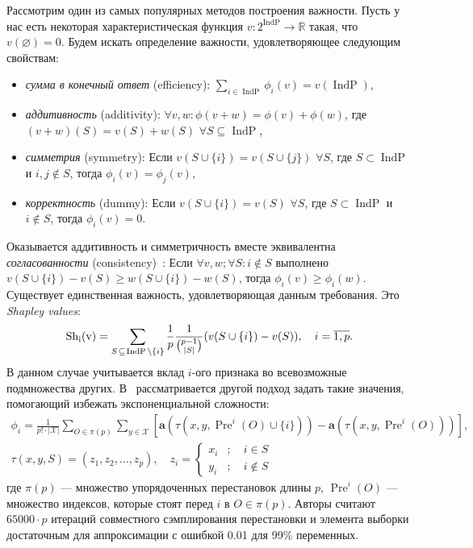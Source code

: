 \documentclass[12pt]{article}
\begin{document}
Рассмотрим один из самых популярных методов построения важности. Пусть у нас есть некоторая характеристическая функция $v: 2^{\operatorname{IndP}} \rightarrow \mathbb{R} $ такая, что $v(\varnothing)=0$. Будем искать определение важности, удовлетворяющее следующим свойствам:
\begin{itemize}[noitemsep]
    \item \emph{сумма в конечный ответ} (efficiency): $\sum_{i \in \operatorname{IndP}} \phi_{i}(v)=v(\operatorname{IndP})$,
    \item \emph{аддитивность} (additivity): $\forall v, w: \phi(v+w)=\phi(v)+\phi(w)$, где $(v+w)(S)=v(S)+w(S)$ $\forall S  \subseteq \operatorname{IndP}$,
    \item \emph{симметрия} (symmetry): Если $v(S \cup\{i\})=v(S \cup\{j\})$ $\forall S$, где $S \subset \operatorname{IndP}$ и $i, j \notin S$, тогда $\phi_{i}(v)=\phi_{j}(v)$,
    \item \emph{корректность} (dummy): Если $v(S \cup\{i\})=v(S)$ $\forall S$, где $S \subset \operatorname{IndP}$ и $i \notin S$, тогда $\phi_{i}(v)=0$.
\end{itemize}
Оказывается аддитивность и симметричность вместе эквивалентна \emph{согласованности} \newline
(consistency)~\citep{deepshap}: Если $\forall v, w; \forall S:i \notin S$ выполнено $v(S \cup\{i\}) - v(S) \geq w(S \cup\{i\}) - w(S)$, тогда $\phi_{i}(v) \geq \phi_{i}(w)$. Существует единственная важность, удовлетворяющая данным требования. Это \emph{Shapley values}:
\begin{equation*}
    \operatorname{S h_{i}(v)}=\sum_{S \hspace{0.1em}\subseteq\hspace{0.1em} \operatorname{IndP} \backslash\{i\}} \frac{1}{p} \frac{1}{{p-1\choose |S|}} (v(S \cup\{i\})-v(S)), \quad i=\overline{1, p}.
\end{equation*}
В данном случае учитывается вклад $i$-ого признака во всевозможные подмножества других. В~\citep{shap_perm} рассматривается другой подход задать такие значения, помогающий избежать экспоненциальной сложности:
\begin{gather*}
    \phi_{i}=\frac{1}{p ! \cdot|\mathcal{X}|} \sum_{O \in \pi(p)} \sum_{y \in \mathcal{X}}\left[\mathbf{a}\left(\tau\left(x, y, \operatorname{Pre}^{i}(O) \cup\{i\}\right)\right)-\mathbf{a}\left(\tau\left(x, y, \operatorname{Pre}^{i}(O)\right)\right)\right],\\
    \tau(x, y, S)=\left(z_{1}, z_{2}, \ldots, z_{p}\right), \quad z_{i}=\left\{\begin{array}{ll}
    x_{i} & ; \quad i \in S \\
    y_{i} & ; \quad i \notin S
    \end{array}\right.
\end{gather*}
где $\pi(p)$ --- множество упорядоченных перестановок длины $p$, $\operatorname{Pre}^{i}(O)$ --- множество индексов, которые стоят перед $i$ в $O \in \pi(p)$. Авторы считают $65000 \cdot p$ итераций совместного сэмплирования перестановки и элемента выборки достаточным для аппроксимации с ошибкой 0.01 для 99\% переменных.
\end{document}
